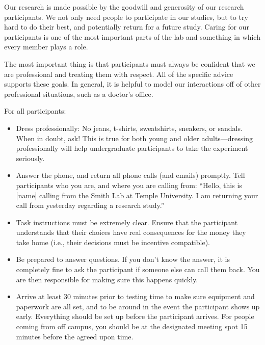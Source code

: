 \documentclass[letterpaper,12pt,oneside]{memoir}
\begin{document}
Our research is made possible by the goodwill and generosity of our research participants. We not only need people to participate in our studies, but to try hard to do their best, and potentially return for a future study. Caring for our participants is one of the most important parts of the lab and something in which every member plays a role.

The most important thing is that participants must always be confident that we are professional and treating them with respect. All of the specific advice supports these goals. In general, it is helpful to model our interactions off of other professional situations, such as a doctor's office.

For all participants:

\begin{itemize}

\item Dress professionally: No jeans, t-shirts, sweatshirts, sneakers, or sandals. When in doubt, ask! This is true for both young and older adults---dressing professionally will help undergraduate participants to take the experiment seriously.

\item Answer the phone, and return all phone calls (and emails) promptly. Tell participants who you are, and where you are calling from: ``Hello, this is [name] calling from the Smith Lab at Temple University. I am returning your call from yesterday regarding a research study.''

\item Task instructions must be extremely clear. Ensure that the participant understands that their choices have real consequences for the money they take home (i.e., their decisions must be incentive compatible). 

\item Be prepared to answer questions. If you don't know the answer, it is completely fine to ask the participant if someone else can call them back. You are then responsible for making sure this happens quickly.

\item Arrive at least 30 minutes prior to testing time to make sure equipment and paperwork are all set, and to be around in the event the participant shows up early. Everything should be set up before the participant arrives. For people coming from off campus, you should be at the designated meeting spot 15 minutes before the agreed upon time.

\end{itemize}
	
\end{document}
